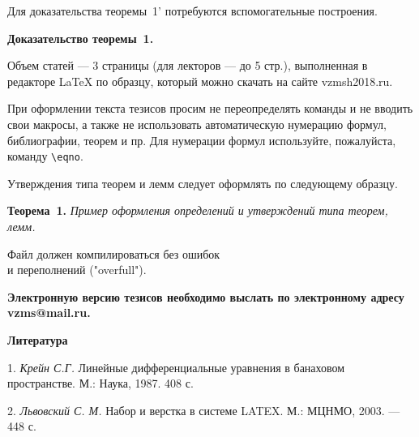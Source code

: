 \documentclass[a5paper,12pt,openbib]{report}
\begin{document}
Для доказательства теоремы~1' потребуются вспомогательные построения.


\textbf{Доказательство теоремы~1.}


Объем статей --- 3 страницы (для лекторов --- до 5 стр.),
выполненная в редакторе  LaTeX по  образцу, который можно скачать на
сайте vzmsh2018.ru.

При оформлении текста тезисов просим не  переопределять команды и не
вводить свои макросы, а также не использовать автоматическую
нумерацию формул, библиографии, теорем и пр. Для нумерации формул
используйте, пожалуйста, команду \verb"\eqno".

Утверждения типа теорем и лемм следует оформлять по следующему
образцу.

\textbf{Теорема~1.} {\it Пример оформления определений и утверждений
типа теорем, лемм.}

\begin{center}
Файл должен компилироваться без ошибок \\
и переполнений ("overfull").
\end{center}

\textbf{Электронную версию тезисов необходимо выслать  по
электронному адресу vzms@mail.ru.}

\smallskip \centerline{\bf Литература}\nopagebreak

1. {\it Крейн С.Г.} Линейные дифференциальные уравнения в банаховом пространстве. М.: Наука, 1987. 408 с.

2. {\it Львовский С. М.} Набор и верстка в системе LATEX. М.: МЦНМО, 2003. — 448 с.
\end{document}
